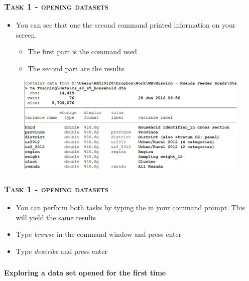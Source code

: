 \documentclass[10pt]{beamer}
\begin{document}
	\begin{frame}
			\frametitle{\textsc{Task 1 - opening datasets}}

		\begin{itemize}
			\item You can see that one the second command printed information on your screen.
			\begin{itemize}
				\item The first part is the command used
				\item The second part are the results
			\end{itemize}
		\end{itemize}

		 \begin{figure}[H] 
				\centering
				\includegraphics[width=0.9\linewidth]{task1}
		\end{figure}
	\end{frame}



	\begin{frame}
			\frametitle{\textsc{Task 1 - opening datasets}}
		\begin{itemize}
			\item You can perform both tasks by typing the in your command prompt. This will yield the same results
			
			\item Type \textit{browse} in the command window and press enter
			
			\item Type \textit{describe} and press enter
			
		\end{itemize}
	\end{frame}

	\begin{frame}
		\frametitle{\textsc{}}
		\begin{center}
			\Large  \textbf{Exploring a data set opened for the first time}
		\end{center}
	\end{frame}
\end{document}
